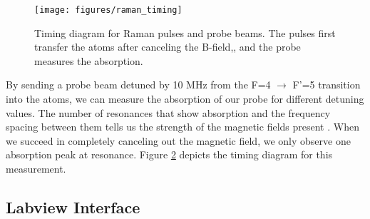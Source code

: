 \begin{figure}[!ht]
  \centering
  \hspace{5pt}
  \hspace{5pt}
   \caption[Raman spectroscopy transitions]{ }
  \label{fig:raman_tuning}
\end{figure}


\begin{figure}[!ht] 
 \centering 
 \texttt{[image: figures/raman\_timing]} 
 \caption[Raman timing diagram]{Timing diagram for Raman pulses and probe beams.  The pulses first transfer the atoms after canceling the B-field,, and the probe measures the absorption.} 
 \label{fig:raman_timing} 
\end{figure}

By sending a probe beam detuned by 10 MHz from the F=4 $\to$ F'=5 transition into the atoms, we can measure the absorption of our probe for different detuning values.  The number of resonances that show absorption and the frequency spacing between them tells us the strength of the magnetic fields present \cite{felinto2005control}.  When we succeed in completely canceling out the magnetic field, we only observe one absorption peak at resonance.  Figure \ref{fig:raman_timing} depicts the timing diagram for this measurement.

 



\subsection{Labview Interface} 

